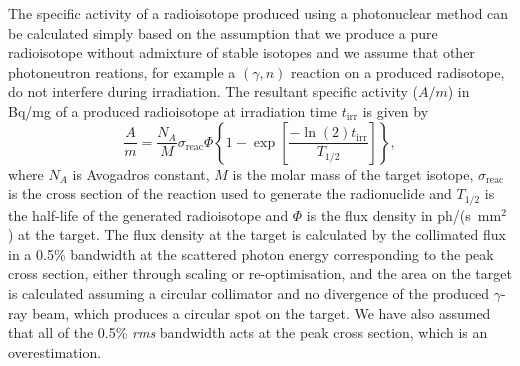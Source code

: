 \documentclass[../main.tex]{subfiles}
\begin{document}
The specific activity of a radioisotope produced using a photonuclear method can be calculated simply based on the assumption that we produce a pure radioisotope without admixture of stable isotopes \cite{habs2011production} and we assume that other photoneutron reations, for example a $\left(\gamma,n\right)$ reaction on a produced radisotope, do not interfere during irradiation. The resultant specific activity ($A/m$) in \si{\becquerel}/\si{\milli\gram} of a produced radioisotope at irradiation time $t_{\mathrm{irr}}$ is given by \cite{habs2011production}
\begin{equation}
\frac{A}{m} = \frac{N_{A}}{M}\sigma_{\mathrm{reac}}\Phi\left\{1-\exp\left[\frac{-\ln\left(2\right)t_{\mathrm{irr}}}{T_{1/2}}\right]\right\},
\label{eq:specific_activity}    
\end{equation}
where $N_{A}$ is Avogadros constant, $M$ is the molar mass of the target isotope, $\sigma_{\mathrm{reac}}$ is the cross section of the reaction used to generate the radionuclide and $T_{1/2}$ is the half-life of the generated radioisotope and $\Phi$ is the flux density in ph/(\si{\second}~$\mathrm{\si{\milli\meter}}^2$) at the target. The flux density at the target is calculated by the collimated flux in a 0.5\% bandwidth at the scattered photon energy corresponding to the peak cross section, either through scaling or re-optimisation, and the area on the target is calculated assuming a circular collimator and no divergence of the produced $\gamma$-ray beam, which produces a circular spot on the target. We have also assumed that all of the 0.5\% \textit{rms} bandwidth acts at the peak cross section, which is an overestimation. 
\end{document}
